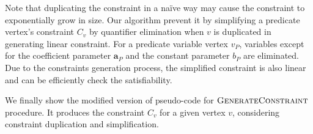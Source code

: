 Note that duplicating the constraint in a na\"{i}ve way may cause the
constraint to exponentially grow in size.  Our algorithm prevent it by
simplifying a predicate vertex's constraint $C_v$ by quantifier
elimination when $v$ is duplicated in generating linear constraint.
For a predicate variable vertex $v_P$, variables except for the
coefficient parameter $\mathbf{a}_P$ and the constant parameter $b_P$
are eliminated.  Due to the constraints generation process, the
simplified constraint is also linear and can be efficiently check the
satisfiability.

We finally show the modified version of pseudo-code for $\mbox{\sc GenerateConstraint}$
procedure.  It produces the constraint $C_v$ for a given vertex $v$,
considering constraint duplication and simplification.

\begin{algorithm}
\caption{$ \genConstr (G, v, V_\star) $}\label{alg:genConstr}
\begin{algorithmic}
    \ELSE
    \ENDIF
  \ENDFOR
\ENDFOR
\end{algorithmic}
\end{algorithm}
